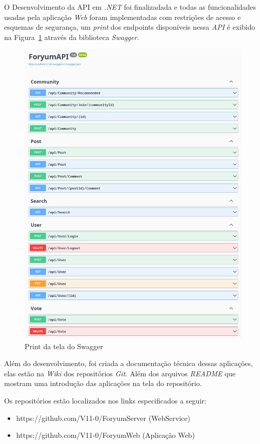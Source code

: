 \documentclass[12pt]{article}
\begin{document}
O Desenvolvimento da API em \textit{.NET} foi finalizadada e todas as funcionalidades
usadas pela aplicação \textit{Web} foram implementadas com restrições de acesso e esquemas de
segurança, um \textit{print} dos endpoints disponíveis nessa \textit{API} é exibido
na Figura~\ref{fig:swagger} através da biblioteca \textit{Swagger}.

\begin{figure}[H]
    \centering
    \includegraphics[width=1\textwidth]{prints/swagger.png}
    \caption{Print da tela do Swagger}\label{fig:swagger}
\end{figure}

Além do desenvolvimento, foi criada a documentação técnica dessas aplicações, elas estão
na \textit{Wiki} dos repositórios \textit{Git}. Além dos arquivos \textit{README} que mostram
uma introdução das aplicações na tela do repositório.

Os repositórios estão localizados nos links especificados a seguir:
\begin{itemize}
	\item https://github.com/V11-0/ForyumServer (WebService)
	\item https://github.com/V11-0/ForyumWeb (Aplicação Web)
\end{itemize}
\end{document}
